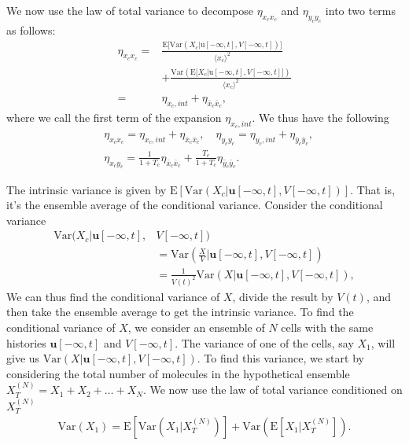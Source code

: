 \documentclass[%
 reprint,prx,
superscriptaddress,
%
%
%
%
%
%
%
%
%
 amsmath,amssymb,
 aps,
%
%
%
%
%
%
]{revtex4-2}
\begin{document}
{{%
%
%
%
%
%
%
%
%
We now use the law of total variance to decompose $\eta_{x_{c}x_{c}}$ and $\eta_{y_{c}y_{c}}$ into two terms as follows: 
\begin{align*}
    \eta_{x_{c}x_{c}} = &\frac{\mathrm{E}\big[\text{Var}(X_{c}|\mathrm{u}[-\infty,t], V[-\infty,t])\big]}{\langle x_{c} \rangle^{2}} \\ \quad &+ \frac{\text{Var}\left(\mathrm{E}\big[X_{c}|\mathrm{u}[-\infty,t], V[-\infty,t]\big]\right)}{\langle x_{c} \rangle^{2}} 
    \\=& \eta_{x_{c},int} + \eta_{\bar{x}_{c}\bar{x}_{c}} ,
\end{align*}
where we call the first term of the expansion $\eta_{x_{c},int}$. We thus have the following
%
%
%
\begin{align}
 &\eta_{x_{c}x_{c}} = \eta_{x_{c},int} + \eta_{\bar{x}_{c}\bar{x}_{c}}, \quad \eta_{y_{c}y_{c}} = \eta_{y_{c},int} + \eta_{\bar{y}_{c}\bar{y}_{c}}, \nonumber\\   &\eta_{x_{c}y_{c}} = \frac{1}{1+T_{c}}\eta_{\bar{x}_{c}\bar{x}_{c}} + \frac{T_{c}}{1+T_{c}}\eta_{\bar{y}_{c}\bar{y}_{c}}. \quad
\label{EQ: Concentrations-1step-3-equations}
\end{align}

The intrinsic variance is given by $\mathrm{E}\left[ \text{Var}(X_{c}|\mathbf{u}[-\infty,t], V[-\infty,t]) \right]$. 
That is, it's the ensemble average of the conditional variance. Consider the conditional variance
\begin{align*}
\text{Var}(X_{c}|\mathbf{u}[-\infty,t], &V[-\infty,t]) 
			      \\ &= \text{Var}\left(\frac{X}{V}\Big| \mathbf{u}[-\infty,t], V[-\infty,t]\right) 
			    \\&= \frac{1}{V(t)^{2}}\text{Var}\left(X| \mathbf{u}[-\infty,t], V[-\infty,t]\right)  ,
\end{align*}
 We can thus find the conditional variance of $X$, 
divide the result by $V(t)$, and then take the ensemble average to get the intrinsic variance. 
To find the conditional variance of $X$, we consider an ensemble of $N$ cells with the same histories 
$\mathbf{u}[-\infty,t]$ and $V[-\infty,t]$. The variance of one of the cells, 
say $X_{1}$, will give us $\text{Var}(X|\mathbf{u}[-\infty,t], V[-\infty,t])$. To find this variance, 
we start by considering the total number of molecules in the hypothetical ensemble
$X_{T}^{(N)} = X_{1} + X_{2} + \dots + X_{N}$. We now use the law of total variance conditioned on $X_{T}^{(N)}$
\begin{align}
 \text{Var}(X_{1}) = \mathrm{E}[ \text{Var}(X_{1}|X_{T}^{(N)}) ] + \text{Var}(\mathrm{E}[X_{1}|X_{T}^{(N)}]) .
\label{EQ: Consentrations-1step-xtotal-law-of-total-variance}
\end{align}


}}
\end{document}
